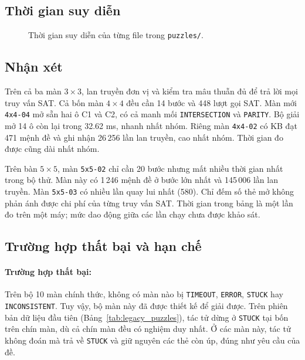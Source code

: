 \documentclass[12pt,a4paper]{article}
\begin{document}
    \subsection{Thời gian suy diễn}
    \begin{figure}[H]
    \centering
    \caption{Thời gian suy diễn của từng file trong \texttt{puzzles/}.}
    \end{figure}

    \subsection{Nhận xét}
    Trên cả ba màn $3\times3$, lan truyền đơn vị và kiểm tra mâu thuẫn đủ để trả lời mọi truy vấn SAT. Cả bốn màn $4\times4$ đều cần 14 bước và 448 lượt gọi SAT. Màn mới \texttt{4x4-04} mở sẵn hai ô C1 và C2, có cả manh mối \texttt{INTERSECTION} và \texttt{PARITY}. Bộ giải mở 14 ô còn lại trong 32.62 ms, nhanh nhất nhóm. Riêng màn \texttt{4x4-02} có KB đạt 471 mệnh đề và ghi nhận 26\,256 lần lan truyền, cao nhất nhóm. Thời gian đo được cũng dài nhất nhóm.

    Trên bàn $5\times5$, màn \texttt{5x5-02} chỉ cần 20 bước nhưng mất nhiều thời gian nhất trong bộ thử. Màn này có 1\,246 mệnh đề ở bước lớn nhất và 145\,006 lần lan truyền. Màn \texttt{5x5-03} có nhiều lần quay lui nhất (580). Chỉ đếm số thẻ mở không phản ánh được chi phí của từng truy vấn SAT. Thời gian trong bảng là một lần đo trên một máy; mức dao động giữa các lần chạy chưa được khảo sát.

    \subsection{Trường hợp thất bại và hạn chế}
    \paragraph{Trường hợp thất bại:} Trên bộ 10 màn chính thức, không có màn nào bị \texttt{TIMEOUT}, \texttt{ERROR}, \texttt{STUCK} hay \texttt{INCONSISTENT}. Tuy vậy, bộ màn này đã được thiết kế để giải được. Trên phiên bản dữ liệu đầu tiên (Bảng~\ref{tab:legacy_puzzles}), tác tử dừng ở \texttt{STUCK} tại bốn trên chín màn, dù cả chín màn đều có nghiệm duy nhất. Ở các màn này, tác tử không đoán mà trả về \texttt{STUCK} và giữ nguyên các thẻ còn úp, đúng như yêu cầu của đề.
\end{document}
